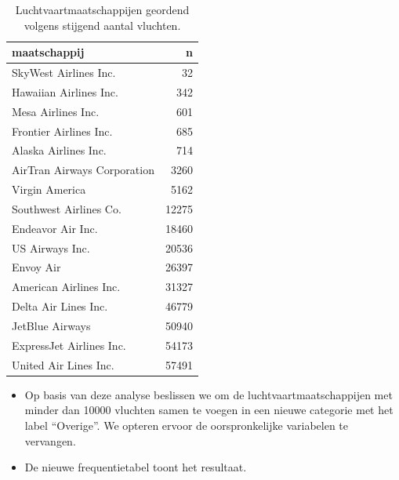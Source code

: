 \documentclass[]{tufte-book}
\begin{document}
\begin{table}

\caption{\label{tab:5-22b}Luchtvaartmaatschappijen geordend volgens stijgend aantal vluchten.}
\centering
\fontsize{10}{12}\selectfont
\begin{tabular}[t]{lr}
\toprule
maatschappij & n\\
\midrule
SkyWest Airlines Inc. & 32\\
Hawaiian Airlines Inc. & 342\\
Mesa Airlines Inc. & 601\\
Frontier Airlines Inc. & 685\\
Alaska Airlines Inc. & 714\\
\addlinespace
AirTran Airways Corporation & 3260\\
Virgin America & 5162\\
Southwest Airlines Co. & 12275\\
Endeavor Air Inc. & 18460\\
US Airways Inc. & 20536\\
\addlinespace
Envoy Air & 26397\\
American Airlines Inc. & 31327\\
Delta Air Lines Inc. & 46779\\
JetBlue Airways & 50940\\
ExpressJet Airlines Inc. & 54173\\
\addlinespace
United Air Lines Inc. & 57491\\
\bottomrule
\end{tabular}
\end{table}

\begin{itemize}
\item
  Op basis van deze analyse beslissen we om de luchtvaartmaatschappijen met minder dan 10000 vluchten samen te voegen in een nieuwe categorie met het label ``Overige''. We opteren ervoor de oorspronkelijke variabelen te vervangen.
\item
  De nieuwe frequentietabel toont het resultaat.
\end{itemize}
\end{document}
